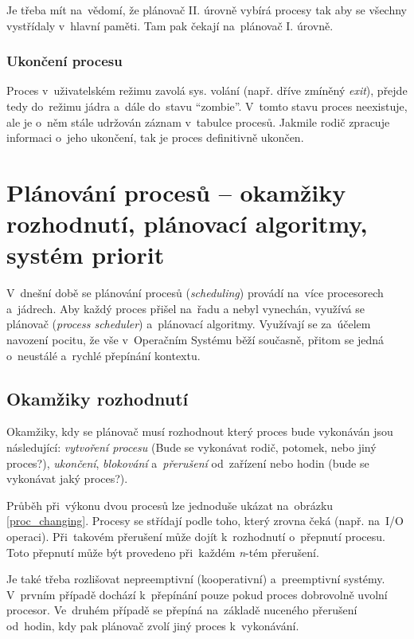 Je třeba mít na~vědomí, že plánovač II. úrovně vybírá procesy tak aby se všechny vystřídaly v~hlavní paměti. Tam pak čekají na~plánovač I. úrovně.

\subsubsection{Ukončení procesu}

Proces v~uživatelském režimu zavolá sys. volání (např. dříve zmíněný \emph{exit}), přejde tedy do~režimu jádra a~dále do~stavu \enquote{zombie}. V~tomto stavu proces neexistuje, ale je o~něm stále udržován záznam v~tabulce procesů. Jakmile rodič zpracuje informaci o~jeho ukončení, tak je proces definitivně ukončen.


\clearpage
\section{Plánování procesů -- okamžiky rozhodnutí, plánovací algoritmy, systém priorit}
\label{planning}

V~dnešní době se plánování procesů (\emph{scheduling}) provádí na~více procesorech a~jádrech. Aby každý proces přišel na~řadu a nebyl vynechán, využívá se plánovač (\emph{process scheduler}) a~plánovací algoritmy. Využívají se za~účelem navození pocitu, že vše v~Operačním Systému běží současně, přitom se jedná o~neustálé a~rychlé přepínání kontextu.

\subsection{Okamžiky rozhodnutí}

Okamžiky, kdy se plánovač musí rozhodnout který proces bude vykonáván jsou následující: \emph{vytvoření procesu} (Bude se vykonávat rodič, potomek, nebo jiný proces?), \emph{ukončení}, \emph{blokování} a~\emph{přerušení} od~zařízení nebo hodin (bude se vykonávat jaký proces?).

Průběh při~výkonu dvou procesů lze jednoduše ukázat na~obrázku \ref{proc_changing}. Procesy se střídají podle toho, který zrovna čeká (např. na~I/O operaci). Při~takovém přerušení může dojít k~rozhodnutí o~přepnutí procesu. Toto přepnutí může být provedeno při~každém \emph{n}-tém přerušení.

Je také třeba rozlišovat nepreemptivní (kooperativní) a~preemptivní systémy. V~prvním případě dochází k~přepínání pouze pokud proces dobrovolně uvolní procesor. Ve~druhém případě se přepíná na~základě nuceného přerušení od~hodin, kdy pak plánovač zvolí jiný proces k~vykonávání.

